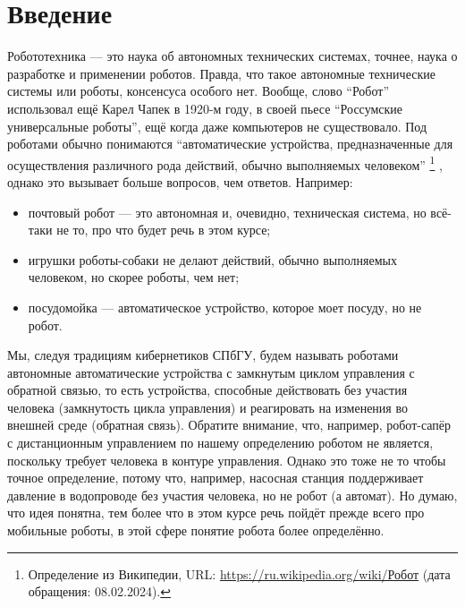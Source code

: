 \documentclass{../../text-style}
\begin{document}
\maketitle
\thispagestyle{empty}

\section{Введение}

Робототехника --- это наука об автономных технических системах, точнее, наука о разработке и применении роботов.
Правда, что такое автономные технические системы или роботы, консенсуса особого нет.
Вообще, слово \enquote{Робот} использовал ещё Карел Чапек в 1920-м году, в своей пьесе \enquote{Россумские универсальные роботы}, ещё когда даже компьютеров не существовало.
Под роботами обычно понимаются \enquote{автоматические устройства, предназначенные для осуществления различного рода действий, обычно выполняемых человеком}%
\footnote{Определение из Википедии, URL: \url{https://ru.wikipedia.org/wiki/Робот} (дата обращения: 08.02.2024).}%
, однако это вызывает больше вопросов, чем ответов. Например:

\begin{itemize}
    \item почтовый робот --- это автономная и, очевидно, техническая система, но всё-таки не то, про что будет речь в этом курсе;
    \item игрушки роботы-собаки не делают действий, обычно выполняемых человеком, но скорее роботы, чем нет;
    \item посудомойка --- автоматическое устройство, которое моет посуду, но не робот.
\end{itemize}

Мы, следуя традициям кибернетиков СПбГУ, будем называть роботами автономные автоматические устройства с замкнутым циклом управления с обратной связью, то есть устройства, способные действовать без участия человека (замкнутость цикла управления) и реагировать на изменения во внешней среде (обратная связь).
Обратите внимание, что, например, робот-сапёр с дистанционным управлением по нашему определению роботом не является, поскольку требует человека в контуре управления.
Однако это тоже не то чтобы точное определение, потому что, например, насосная станция поддерживает давление в водопроводе без участия человека, но не робот (а автомат).
Но думаю, что идея понятна, тем более что в этом курсе речь пойдёт прежде всего про мобильные роботы, в этой сфере понятие робота более определённо.
\end{document}
